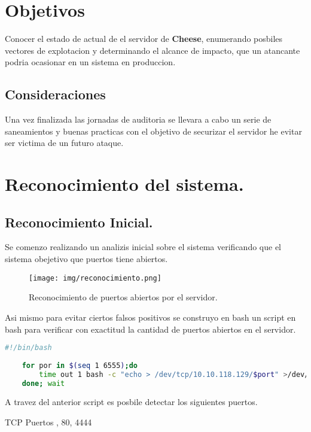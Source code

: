 \documentclass[a4paper]{article} %
\newcommand{\machineName}{Cheese} %
\begin{document}
	\section{Objetivos}
	Conocer el estado de actual de el servidor de \textbf{\machineName}, enumerando posbiles vectores de explotacion y determinando el alcance de impacto, que un atancante podria ocasionar en un sistema en produccion.
	\subsection{Consideraciones} %
	Una vez finalizada las jornadas de auditoria se llevara a cabo un serie de saneamientos y buenas practicas con el objetivo de securizar el servidor he evitar ser victima de un futuro ataque.

	\vspace{0.5cm}
	\begin{figure}[h]
	\begin{center}
	\end{center}
	\end{figure}
	\clearpage
	\section{Reconocimiento del sistema.}
	\subsection{Reconocimiento Inicial.}
	\vspace{0.3cm}
	Se comenzo realizando un analizis inicial sobre el sistema verificando que el sistema obejetivo que puertos tiene abiertos.

	\vspace{0.5cm}
	\begin{figure}[h]	
	\begin{center}
		\texttt{[image: img/reconocimiento.png]}
		\caption{Reconocimiento de puertos abiertos por el servidor.}
	\end{center}
	\end{figure}
	\vspace{0.2cm}
	
	Asi mismo para evitar ciertos falsos positivos se construyo en bash un script en bash para verificar con exactitud la cantidad de puertos abiertos en el servidor.
	\vspace{0.5cm}
	\begin{lstlisting}[language=Bash, caption=Script]
	#!/bin/bash
	
	for por in $(seq 1 6555);do
		time out 1 bash -c "echo > /dev/tcp/10.10.118.129/$port" >/dev/null && echo "$port/tcp" &
	done; wait 
	\end{lstlisting}
	\vspace{1cm}
	A travez del anterior script es posbile detectar los siguientes puertos.
	\begin{schema}{TCP}
	Puertos
	, 80, 4444
	\end{schema}
\end{document}

